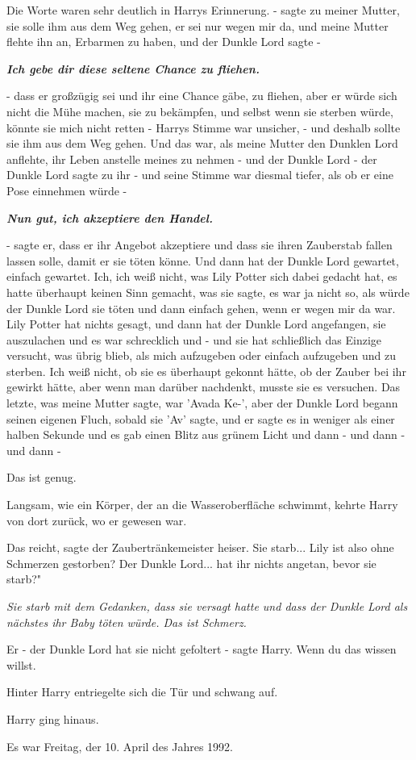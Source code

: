 Die Worte waren sehr deutlich in Harrys Erinnerung. \glqq - sagte zu meiner
Mutter, sie solle ihm aus dem Weg gehen, er sei nur wegen mir da, und meine
Mutter flehte ihn an, Erbarmen zu haben, und der Dunkle Lord sagte -\grqq{}

\textbf{\emph{Ich gebe dir diese seltene Chance zu fliehen. }}

\glqq - dass er großzügig sei und ihr eine Chance gäbe, zu fliehen, aber er
würde sich nicht die Mühe machen, sie zu bekämpfen, und selbst wenn sie sterben
würde, könnte sie mich nicht retten -\grqq{} Harrys Stimme war unsicher, \glqq -
und deshalb sollte sie ihm aus dem Weg gehen. Und das war, als meine Mutter den
Dunklen Lord anflehte, ihr Leben anstelle meines zu nehmen - und der Dunkle Lord
- der Dunkle Lord sagte zu ihr - und seine Stimme war diesmal tiefer, als ob er
eine Pose einnehmen würde -\grqq{}

\textbf{\emph{Nun gut, ich akzeptiere den Handel.}}

\glqq - sagte er, dass er ihr Angebot akzeptiere und dass sie ihren Zauberstab
fallen lassen solle, damit er sie töten könne. Und dann hat der Dunkle Lord
gewartet, einfach gewartet. Ich, ich weiß nicht, was Lily Potter sich dabei
gedacht hat, es hatte überhaupt keinen Sinn gemacht, was sie sagte, es war ja
nicht so, als würde der Dunkle Lord sie töten und dann einfach gehen, wenn er
wegen mir da war. Lily Potter hat nichts gesagt, und dann hat der Dunkle Lord
angefangen, sie auszulachen und es war schrecklich und - und sie hat schließlich
das Einzige versucht, was übrig blieb, als mich aufzugeben oder einfach
aufzugeben und zu sterben. Ich weiß nicht, ob sie es überhaupt gekonnt hätte, ob
der Zauber bei ihr gewirkt hätte, aber wenn man darüber nachdenkt, musste sie es
versuchen. Das letzte, was meine Mutter sagte, war 'Avada Ke-', aber der Dunkle
Lord begann seinen eigenen Fluch, sobald sie 'Av' sagte, und er sagte es in
weniger als einer halben Sekunde und es gab einen Blitz aus grünem Licht und
dann - und dann - und dann -\grqq{}

\glqq Das ist genug.\grqq{}

Langsam, wie ein Körper, der an die Wasseroberfläche schwimmt, kehrte Harry von
dort zurück, wo er gewesen war.

\glqq Das reicht\grqq{}, sagte der Zaubertränkemeister heiser. \glqq Sie
starb... Lily ist also ohne Schmerzen gestorben? Der Dunkle Lord... hat ihr
nichts angetan, bevor sie starb?"

\emph{Sie starb mit dem Gedanken, dass sie versagt hatte und dass der Dunkle Lord als nächstes ihr Baby töten würde. Das ist Schmerz.}

\glqq Er - der Dunkle Lord hat sie nicht gefoltert -\grqq{} sagte Harry. \glqq
Wenn du das wissen willst.\grqq{}

Hinter Harry entriegelte sich die Tür und schwang auf.

Harry ging hinaus.

Es war Freitag, der 10. April des Jahres 1992.

